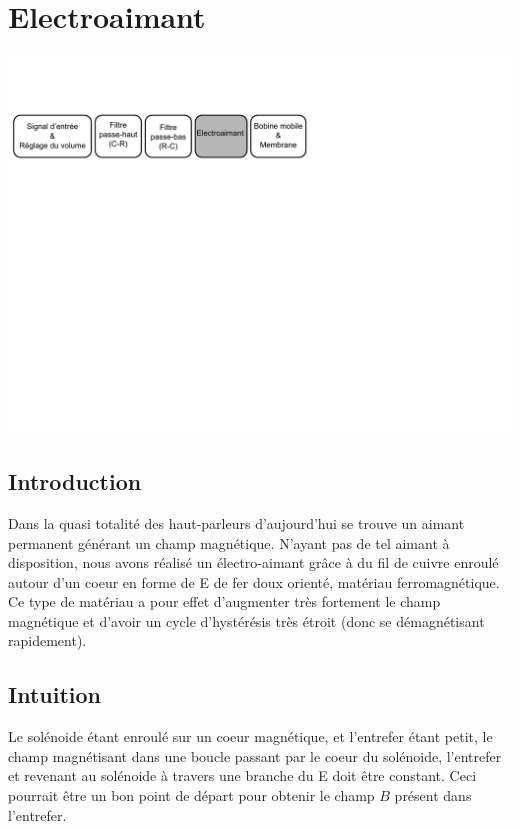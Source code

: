 \chapter{Electroaimant}

\begin{center}
\includegraphics[width=\textwidth]{img/Schemabloc3}
\end{center}

\section{Introduction}
Dans la quasi totalité des haut-parleurs d'aujourd'hui se trouve un aimant permanent générant un champ magnétique.
N'ayant pas de tel aimant à disposition, nous avons réalisé un électro-aimant grâce à du fil de cuivre enroulé autour 
d'un coeur en forme de E de fer doux orienté, matériau ferromagnétique. Ce type de matériau a pour effet d'augmenter très fortement le champ magnétique et d'avoir un cycle d'hystérésis très étroit (donc se démagnétisant rapidement).
\section{Intuition}
Le solénoide étant enroulé sur un coeur magnétique, et l'entrefer étant petit, le champ magnétisant dans 
une boucle passant par le coeur du solénoide, l'entrefer et revenant au solénoide à travers une branche 
du E doit être constant. Ceci pourrait être un bon point de départ pour obtenir le champ $B$ présent dans l'entrefer.

